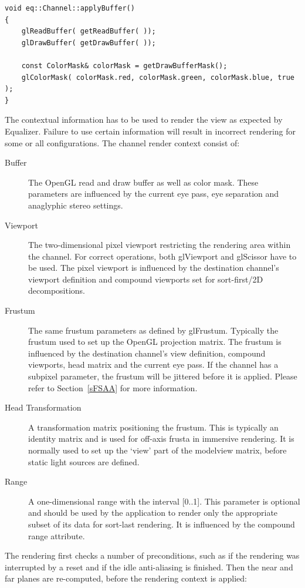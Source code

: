 \documentclass[10pt,a4]{scrartcl}
\newcommand{\sref}[1]{Section~\ref{#1}}
\begin{document}
{\footnotesize\begin{lstlisting}
void eq::Channel::applyBuffer()
{
    glReadBuffer( getReadBuffer( ));
    glDrawBuffer( getDrawBuffer( ));
    
    const ColorMask& colorMask = getDrawBufferMask();
    glColorMask( colorMask.red, colorMask.green, colorMask.blue, true );
}
\end{lstlisting}}

\label{sRenderContext}
The contextual information has to be used to render the view as
expected by Equalizer. Failure to use certain information will result in
incorrect rendering for some or all configurations. The channel render
context consist of:

\begin{description}
\item[Buffer] The OpenGL read and draw buffer as well as color mask.
  These parameters are influenced by the current eye pass, eye
  separation and anaglyphic stereo settings.
\item[Viewport] The two-dimensional pixel viewport restricting the
  rendering area within the channel. For correct operations, both
  \textsf{glViewport} and \textsf{glScissor} have to be used. The pixel
  viewport is influenced by the destination channel's viewport
  definition and compound viewports set for sort-first/2D decompositions.
\item[Frustum] The same frustum parameters as defined by
  \textsf{glFrustum}. Typically the frustum used to set up the OpenGL projection
  matrix. The frustum is influenced by the destination channel's view
  definition, compound viewports, head matrix and the current eye pass. If the
  channel has a subpixel parameter, the frustum will be jittered before it is
  applied. Please refer to \sref{sFSAA} for more information.
\item[Head Transformation] A transformation matrix positioning the
  frustum. This is typically an identity matrix and is used for off-axis
  frusta in immersive rendering. It is normally used to set up the
  `view' part of the modelview matrix, before static light sources are
  defined.
\item[Range] A one-dimensional range with the interval [0..1]. This parameter is
  optional and should be used by the application to render only the appropriate
  subset of its data for sort-last rendering. It is influenced by the compound
  range attribute.
\end{description}

The rendering first checks a number of preconditions, such as if the rendering
was interrupted by a reset and if the idle anti-aliasing is finished. Then the
near and far planes are re-computed, before the rendering context is applied:
\end{document}
